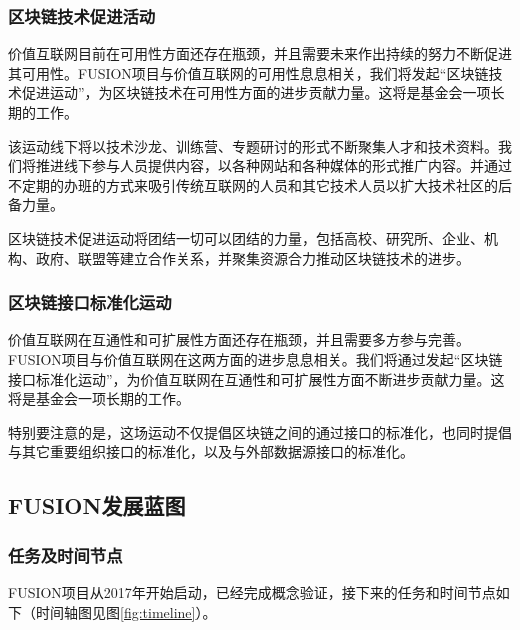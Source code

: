 \documentclass[a4paper,12pt]{article}
\begin{document}
\subsubsection{区块链技术促进活动}

价值互联网目前在可用性方面还存在瓶颈，并且需要未来作出持续的努力不断促进其可用性。FUSION项目与价值互联网的可用性息息相关，我们将发起“区块链技术促进运动”，为区块链技术在可用性方面的进步贡献力量。这将是基金会一项长期的工作。

该运动线下将以技术沙龙、训练营、专题研讨的形式不断聚集人才和技术资料。我们将推进线下参与人员提供内容，以各种网站和各种媒体的形式推广内容。并通过不定期的办班的方式来吸引传统互联网的人员和其它技术人员以扩大技术社区的后备力量。

区块链技术促进运动将团结一切可以团结的力量，包括高校、研究所、企业、机构、政府、联盟等建立合作关系，并聚集资源合力推动区块链技术的进步。

\subsubsection{区块链接口标准化运动}

价值互联网在互通性和可扩展性方面还存在瓶颈，并且需要多方参与完善。FUSION项目与价值互联网在这两方面的进步息息相关。我们将通过发起“区块链接口标准化运动”，为价值互联网在互通性和可扩展性方面不断进步贡献力量。这将是基金会一项长期的工作。

特别要注意的是，这场运动不仅提倡区块链之间的通过接口的标准化，也同时提倡与其它重要组织接口的标准化，以及与外部数据源接口的标准化。

\subsection{FUSION发展蓝图}

\subsubsection{任务及时间节点}

FUSION项目从2017年开始启动，已经完成概念验证，接下来的任务和时间节点如下（时间轴图见图\ref{fig:timeline}）。
\end{document}
